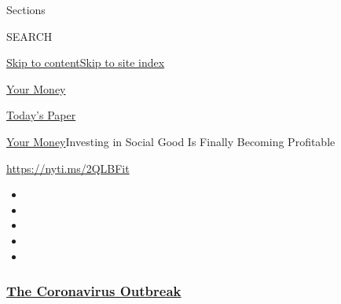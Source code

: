 Sections

SEARCH

\protect\hyperlink{site-content}{Skip to
content}\protect\hyperlink{site-index}{Skip to site index}

\href{https://www.nytimes3xbfgragh.onion/section/your-money}{Your Money}

\href{https://myaccount.nytimes3xbfgragh.onion/auth/login?response_type=cookie\&client_id=vi}{}

\href{https://www.nytimes3xbfgragh.onion/section/todayspaper}{Today's
Paper}

\href{/section/your-money}{Your Money}\textbar{}Investing in Social Good
Is Finally Becoming Profitable

\url{https://nyti.ms/2QLBFit}

\begin{itemize}
\item
\item
\item
\item
\item
\end{itemize}

\hypertarget{the-coronavirus-outbreak}{%
\subsubsection{\texorpdfstring{\href{https://www.nytimes3xbfgragh.onion/news-event/coronavirus?name=styln-coronavirus-national\&region=TOP_BANNER\&block=storyline_menu_recirc\&action=click\&pgtype=Article\&impression_id=47ccc630-f52c-11ea-bc41-9ff49d9e873a\&variant=undefined}{The
Coronavirus
Outbreak}}{The Coronavirus Outbreak}}\label{the-coronavirus-outbreak}}

